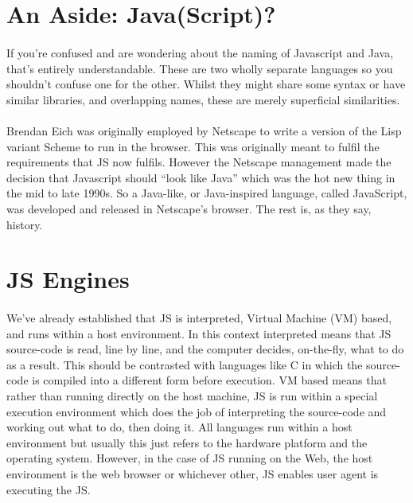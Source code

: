 \section{An Aside: Java(Script)?}
\paragraph{} If you're confused and are wondering about the naming of Javascript and Java, that's entirely understandable. These are two wholly separate languages so you shouldn't confuse one for the other. Whilst they might share some syntax or have similar libraries, and overlapping names, these are merely superficial similarities.
\paragraph{} Brendan Eich was originally employed by Netscape to write a version of the Lisp variant Scheme to run in the browser. This was originally meant to fulfil the requirements that JS now fulfils. However the Netscape management made the decision that Javascript should “look like Java” which was the hot new thing in the mid to late 1990s. So a Java-like, or Java-inspired language, called JavaScript, was developed and released in Netscape's browser. The rest is, as they say, history.


\section{JS Engines}
\paragraph{} We've already established that JS is interpreted, Virtual Machine (VM) based, and runs within a host environment. In this context interpreted means that JS source-code is read, line by line, and the computer decides, on-the-fly, what to do as a result. This should be contrasted with languages like C in which the source-code is compiled into a different form before execution. VM based means that rather than running directly on the host machine, JS is run within a special execution environment which does the job of interpreting the source-code and working out what to do, then doing it. All languages run within a host environment but usually this just refers to the hardware platform and the operating system. However, in the case of JS running on the Web, the host environment is the web browser or whichever other, JS enables user agent is executing the JS.
